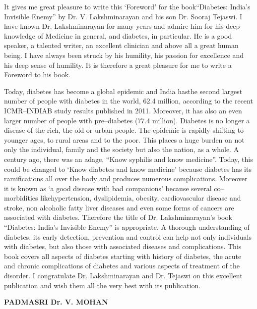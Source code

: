 It gives me great pleasure to write this ‘Foreword’ for the book\break “Diabetes: India's Invisible Enemy” by Dr. V. Lakshminara\-yan and his son Dr. Sooraj Tejaswi. I have known Dr. Lakshminarayan for many years and admire him for his deep knowledge of Medicine in general, and diabetes, in particular. He is a good speaker, a talented writer, an excellent clinician and above all a great human being. I have always been struck by his humi\-lity, his passion for excellence and his deep sense of humility. It is therefore a great pleasure for me to write a Foreword to his book.

Today, diabetes has become a global epidemic and India has\break the second largest number of people with diabetes in the world, 62.4 million, according to the recent ICMR–INDIAB study results published in 2011. Moreover, it has also an even larger number of people with pre–diabetes (77.4 million). Diabetes is no longer a disease of the rich, the old or urban people. The epidemic is rapidly shifting to younger ages, to rural areas and to the poor. This places a huge burden on not only the individual, family and the society but also the nation, as a whole. A century ago, there was an adage, “Know syphilis and know medicine”. Today, this could be changed to ‘Know diabetes and know medicine’ because diabetes has its ramifications all over the body and produces numerous complications. Moreover it is known as ‘a good di\-sease with bad companions’ because several co–morbidities like\break hypertension, dyslipidemia, obesity, cardiovascular disease and stroke, non alcoholic fatty liver diseases and even some forms of cancers are associated with diabetes. Therefore the title of Dr. Lakshminarayan’s book “Diabetes: India's Invisible Enemy” is appropriate. A thorough understanding of diabetes, its early detection, prevention and control can help not only individuals with diabetes, but also those with associated diseases and compli\-cations. This book covers all aspects of diabetes starting with history of diabetes, the acute and chronic complications of diabetes and various aspects of treatment of the disorder. I congra\-tulate Dr. Lakshminarayan and Dr. Tejaswi on this exce\-llent publication and wish them all the very best with its publication.

\begin{flushright}
\textbf{PADMASRI Dr. V. MOHAN}
\end{flushright}

